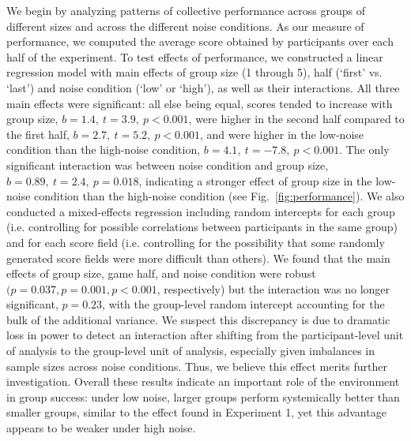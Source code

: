 \documentclass[12pt,letterpaper]{article}
\begin{document}
We begin by analyzing patterns of collective performance across groups of different sizes and across the different noise conditions.
As our measure of performance, we computed the average score obtained by participants over each half of the experiment.
To test effects of performance, we constructed a linear regression model with main effects of group size (1 through 5), half (`first' vs. `last')  and noise condition (`low' or `high'), as well as their interactions.
All three main effects were significant: all else being equal, scores tended to increase with group size, $b=1.4,~t=3.9,~p <0.001$, were higher in the second half compared to the first half, $b=2.7,~t=5.2,~p<0.001$, and were higher in the low-noise condition than the high-noise condition, $b=4.1,~t=-7.8,~p<0.001$.
The only significant interaction was between noise condition and group size, $b=0.89,~t=2.4,~p=0.018$, indicating a stronger effect of group size in the low-noise condition than the high-noise condition (see Fig.~\ref{fig:performance}).
We also conducted a mixed-effects regression including random intercepts for each group (i.e. controlling for possible correlations between participants in the same group) and for each score field (i.e. controlling for the possibility that some randomly generated score fields were more difficult than others). We found that the main effects of group size, game half, and noise condition were robust $(p=0.037,p=0.001,p<0.001$, respectively) but the interaction was no longer significant, $p=0.23$, with the group-level random intercept accounting for the bulk of the additional variance. We suspect this discrepancy is due to dramatic loss in power to detect an interaction after shifting from the participant-level unit of analysis to the group-level unit of analysis, especially given imbalances in sample sizes across noise conditions. Thus, we believe this effect merits further investigation.
Overall these results indicate an important role of the environment in group success: under low noise, larger groups perform systemically better than smaller groups, similar to the effect found in Experiment 1, yet this advantage appears to be weaker under high noise.
\end{document}
